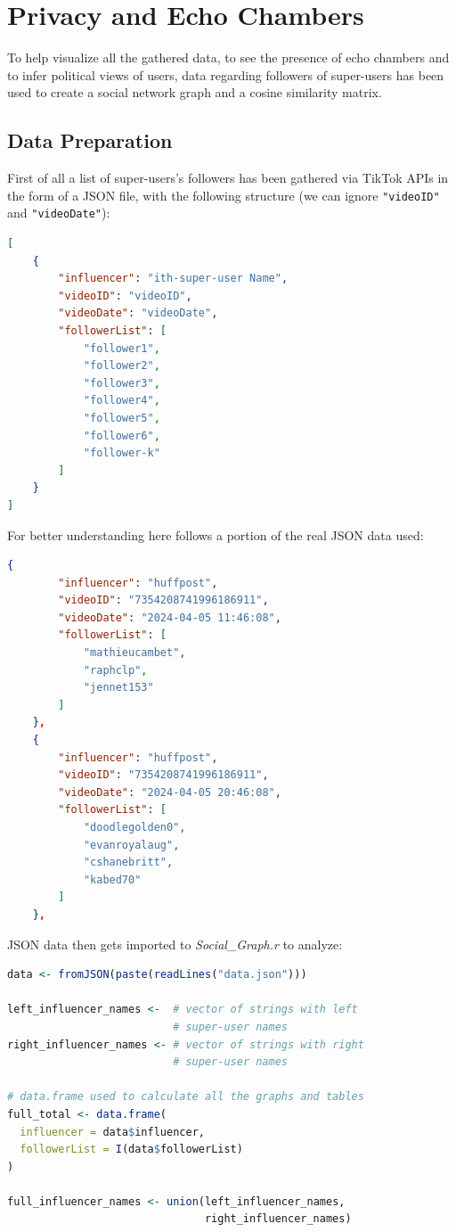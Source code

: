 \section{Privacy and Echo Chambers}
To help visualize all the gathered data, to see the presence of echo chambers and to infer political views of users, data regarding followers of super-users has been used to create a social network graph and a cosine similarity matrix.

\subsection{Data Preparation}
First of all a list of super-users's followers has been gathered via TikTok APIs in the form of a JSON file, with the following structure (we can ignore \verb+"videoID"+ and \verb+"videoDate"+):

\begin{lstlisting}[language=json]
[
    {
        "influencer": "ith-super-user Name",
        "videoID": "videoID",
        "videoDate": "videoDate",
        "followerList": [
            "follower1",
            "follower2",
            "follower3",
            "follower4",
            "follower5",
            "follower6",
            "follower-k"
        ]
    }
]
\end{lstlisting}

For better understanding here follows a portion of the real JSON data used:

\begin{lstlisting}[language=json]
    {
        "influencer": "huffpost",
        "videoID": "7354208741996186911",
        "videoDate": "2024-04-05 11:46:08",
        "followerList": [
            "mathieucambet",
            "raphclp",
            "jennet153"
        ]
    },
    {
        "influencer": "huffpost",
        "videoID": "7354208741996186911",
        "videoDate": "2024-04-05 20:46:08",
        "followerList": [
            "doodlegolden0",
            "evanroyalaug",
            "cshanebritt",
            "kabed70"
        ]
    },
\end{lstlisting}

JSON data then gets imported to \textit{Social\_Graph.r} to analyze:

\begin{lstlisting}[language=R]
data <- fromJSON(paste(readLines("data.json")))

left_influencer_names <-  # vector of strings with left 
                          # super-user names
right_influencer_names <- # vector of strings with right 
                          # super-user names

# data.frame used to calculate all the graphs and tables
full_total <- data.frame(
  influencer = data$influencer,
  followerList = I(data$followerList)
)

full_influencer_names <- union(left_influencer_names, 
                               right_influencer_names)
\end{lstlisting}

